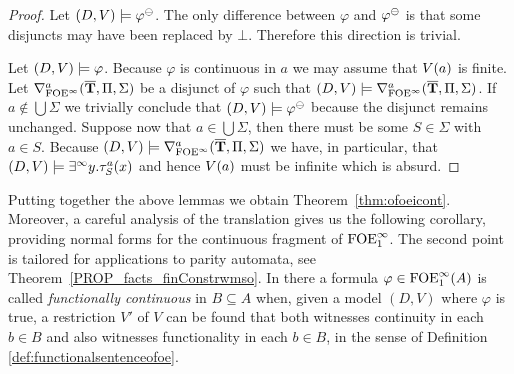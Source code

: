 \begin{proof}
\bigskip
\noindent\fbox{$\Leftarrow$} Let $(D,\val) \models \varphi^\tcont$. The only difference between $\varphi$ and $\varphi^\tcont$ is that some disjuncts may have been replaced by $\bot$. Therefore this direction is trivial.

\bigskip
\noindent\fbox{$\Rightarrow$} Let $(D,\val) \models \varphi$. Because $\varphi$ is continuous in $a$ we may assume that $\val(a)$ is finite. Let $\mondbnfofoei{\vlist{T}}{\Pi}{\Sigma}{a}$ be a disjunct of $\varphi$ such that $(D,\val) \models \mondbnfofoei{\vlist{T}}{\Pi}{\Sigma}{a}$. If $a \notin \bigcup\Sigma$ we trivially conclude that $(D,\val) \models \varphi^\tcont$ because the disjunct remains unchanged. Suppose now that $a\in \bigcup\Sigma$, then there must be some $S\in\Sigma$ with $a\in S$. Because $(D,\val) \models \mondbnfofoei{\vlist{T}}{\Pi}{\Sigma}{a}$ we have, in particular, that $(D,\val) \models \qu y.\tau^a_S(x)$ and hence $\val(a)$ must be infinite which is absurd.
\end{proof}

Putting together the above lemmas we obtain Theorem~\ref{thm:ofoeicont}. Moreover, a careful analysis of the translation gives us the following corollary, providing normal forms for the continuous fragment of $\ofoei$. The second point is tailored for applications to parity automata, see Theorem~\ref{PROP_facts_finConstrwmso}. In there a formula $\varphi  \in \ofoei(A)$ is called \emph{functionally continuous} in $B \subseteq A$ when, given a model $(D,V)$ where $\varphi$ is true, a restriction $V'$ of $V$ can be found that both witnesses continuity in each $b \in B$ and also witnesses functionality in each $b \in B$, in the sense of Definition \ref{def:functionalsentenceofoe}.

